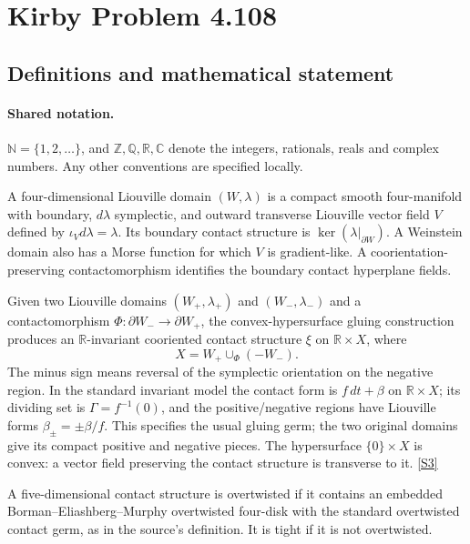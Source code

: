 \documentclass[11pt]{article}
\newcommand{\sref}[2]{\hyperlink{source:#1:#2}{[S#2]}}
\begin{document}
\section{Kirby Problem 4.108}\label{statement}

\subsection{Definitions and mathematical statement}

\paragraph{Shared notation.}$\mathbb N=\{1,2,\ldots\}$, and $\mathbb Z,\mathbb Q,\mathbb R,\mathbb C$ denote the integers, rationals, reals and complex numbers. Any other conventions are specified locally.


A four-dimensional Liouville domain $(W,\lambda)$ is a compact smooth four-manifold with boundary, $d\lambda$ symplectic, and outward transverse Liouville vector field $V$ defined by $\iota_Vd\lambda=\lambda$. Its boundary contact structure is $\ker(\lambda|_{\partial W})$. A Weinstein domain also has a Morse function for which $V$ is gradient-like. A coorientation-preserving contactomorphism identifies the boundary contact hyperplane fields.

Given two Liouville domains $(W_+,\lambda_+)$ and $(W_-,\lambda_-)$ and a contactomorphism $\Phi:\partial W_-\to\partial W_+$, the convex-hypersurface gluing construction produces an $\mathbb R$-invariant cooriented contact structure $\xi$ on $\mathbb R\times X$, where
\[
X=W_+\cup_\Phi(-W_-).
\]
The minus sign means reversal of the symplectic orientation on the negative region. In the standard invariant model the contact form is $f\,dt+\beta$ on $\mathbb R\times X$; its dividing set is $\Gamma=f^{-1}(0)$, and the positive/negative regions have Liouville forms $\beta_\pm=\pm\beta/f$. This specifies the usual gluing germ; the two original domains give its compact positive and negative pieces. The hypersurface $\{0\}\times X$ is convex: a vector field preserving the contact structure is transverse to it. \sref{statement}{3}

A five-dimensional contact structure is overtwisted if it contains an embedded Borman--Eliashberg--Murphy overtwisted four-disk with the standard overtwisted contact germ, as in the source's definition. It is tight if it is not overtwisted.
\end{document}
